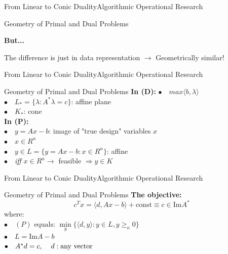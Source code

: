 \documentclass[11pt,aspectratio=169]{beamer}
\newcommand{\TT}{From Linear to Conic Duality}
\newcommand{\TL}{Algorithmic Operational Research}
\newcommand{\PII}{Geometry of Primal and Dual Problems}
\begin{document}
\begin{frame}{\TT}{\TL}
 \begin{block}{\PII}
\Large
\newline
\begin{center}
    \textbf{But...}
\end{center}
The difference is just in data representation $\rightarrow$ Geometrically similar! 
 \end{block}
\end{frame}

\begin{frame}{\TT}{\TL}
 \begin{block}{\PII}
\Large
\textbf{In (D):} \newline
\hspace{2mm}$\bullet \quad max \langle b, \lambda \rangle$ \\
\hspace{2mm}$\bullet \quad L_{*} = \{ \lambda : A^* \lambda = c \}$: affine plane \\
\hspace{2mm}$\bullet \quad K_{*}$: cone \\
\textbf{In (P):} \\
\hspace{2mm}$\bullet \quad y = Ax - b$: image of "true design" variables $x$ \\
\hspace{2mm}$\bullet \quad x \in R^n$ \\
\hspace{2mm}$\bullet \quad y \in L = \{ y = Ax - b: x \in R^n \}$: affine \\
\hspace{2mm}$\bullet \quad$\emph{iff} $x \in R^n \rightarrow$ feasible $\Rightarrow y \in K$ \\
 \end{block}
\end{frame}

\begin{frame}{\TT}{\TL}
 \begin{block}{\PII}
\Large
\newline
\vspace{2mm}
    \textbf{The objective:}
$$c^Tx = \langle d, Ax - b \rangle + \text{const} \equiv c \in \text{Im}{A^*}$$
where: \\
\hspace{2mm} $\bullet \quad (P) \text{ equals: }\min\limits_{y}\{ \langle d,y \rangle : y \in L, y \geq_{\kappa} 0 \}$ \\
\hspace{2mm} $\bullet \quad L = \text{Im}A - b$ \\
\hspace{2mm} $\bullet \quad A^*d = c, \hspace{4mm} d: \text{any vector}$
 \end{block}
\end{frame}
\end{document}
